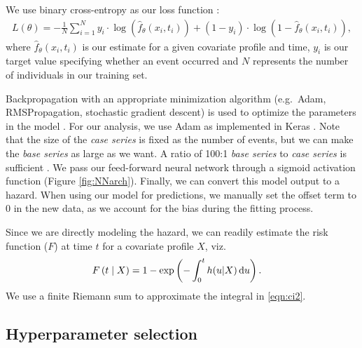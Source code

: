 \documentclass[AMA,STIX1COL,]{WileyNJD-v2}
\begin{document}
We use binary cross-entropy as our loss function \citep{gulli2017}:
\begin{align*}
L(\theta)=-\frac{1}{N} \sum^{N}_{i=1} y_{i} \cdot \log(\hat{f}_{\theta}(x_{i}, t_{i}) ) + (1-y_{i} )\cdot \log(1-\hat{f}_{\theta}(x_{i}, t_{i}) ),
\end{align*} where \(\hat{f}_{\theta}(x_{i}, t_{i})\) is our estimate
for a given covariate profile and time, \(y_{i}\) is our target value
specifying whether an event occurred and \(N\) represents the number of
individuals in our training set.

Backpropagation with an appropriate minimization algorithm (e.g.~Adam,
RMSPropagation, stochastic gradient descent) is used to optimize the
parameters in the model \citep{gulli2017}. For our analysis, we use Adam
as implemented in Keras \citep{gulli2017}. Note that the size of the
\emph{case series} is fixed as the number of events, but we can make the
\emph{base series} as large as we want. A ratio of 100:1 \emph{base
series} to \emph{case series} is sufficient \citep{hanley2009}. We pass
our feed-forward neural network through a sigmoid activation function
(Figure \ref{fig:NNarch}). Finally, we can convert this model output to
a hazard. When using our model for predictions, we manually set the
offset term to 0 in the new data, as we account for the bias during the
fitting process.

Since we are directly modeling the hazard, we can readily estimate the
risk function (\(F\)) at time \(t\) for a covariate profile \(X\),
viz.\begin{align}\label{eqn:ci2}
F\left(t\mid X\right)& = 1 - \exp\left(-\int_{0}^{t}h(u|X) \,\textrm du\right).
\end{align} We use a finite Riemann sum \citep{hughes2020calculus} to
approximate the integral in \eqref{eqn:ci2}.

\hypertarget{hyperparameter-selection}{%
\subsection{Hyperparameter selection}\label{hyperparameter-selection}}
\end{document}
